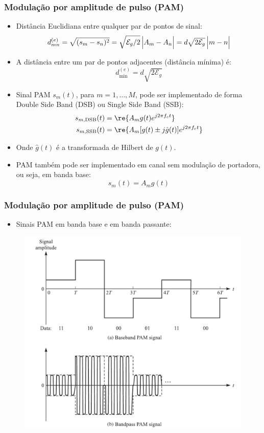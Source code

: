 \begin{frame}
	\frametitle{Modulação por amplitude de pulso (PAM)}

	\begin{itemize}
		\item Distância Euclidiana entre qualquer par de pontos de sinal:
		\begin{equation*}
			d_{mn}^{(e)} = \sqrt{(s_m-s_n)^2} = \sqrt{\mathcal{E}_g/2}\, \Bigl|A_m - A_n\Bigr| = d\sqrt{2\mathcal{E}_g}\, \Bigl|m-n\Bigr|
		\end{equation*}
		\item A distância entre um par de pontos adjacentes (distância mínima) é:
		\begin{equation*}
			d_{\text{min}}^{(e)} = d\sqrt{2\mathcal{E}_g}
		\end{equation*}
		\item Sinal PAM $s_m(t)$,  para $m=1, \ldots, M$,  pode ser implementado de forma Double Side Band (DSB) ou Single Side Band (SSB):
		\begin{align*}
			s_{m, \text{DSB}}(t) &= \re\{A_m g(t) e^{j2\pi f_c t}\} \\
			s_{m, \text{SSB}}(t) &= \re\{A_m [g(t) \pm j\hat{g}(t) ] e^{j2\pi f_c t}\}
		\end{align*}
		\item Onde $\hat{g}(t)$ é a transformada de Hilbert de $g(t)$.
		\item PAM também pode ser implementado em canal sem modulação de portadora,  ou seja,  em banda base:
		\begin{equation*}
			s_m(t) = A_m g(t)
		\end{equation*}

	\end{itemize}

\end{frame}

\begin{frame}
	\frametitle{Modulação por amplitude de pulso (PAM)}

	\begin{itemize}
	 \item Sinais PAM em banda base e em banda passante:
	\end{itemize}

	
	\begin{figure}[t]
	  \begin{center}
	    \includegraphics[width=0.6\columnwidth]{figs/4-3-2}
	  \end{center}
	\end{figure}

\end{frame}



